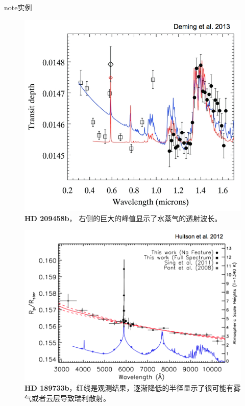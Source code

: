 \documentclass[letterpaper,10pt,english]{sphinxmanual}
\begin{document}
\begin{notice}{note}{实例}
\begin{figure}[htbp]
\centering
\capstart

\includegraphics{transmission1.png}
\caption{\textbf{HD 209458b}， 右侧的巨大的峰值显示了水蒸气的透射波长。}\end{figure}
\begin{figure}[htbp]
\centering
\capstart

\includegraphics{transmission2.png}
\caption{\textbf{HD 189733b}，红线是观测结果，逐渐降低的半径显示了很可能有雾气或者云层导致瑞利散射。}\end{figure}
\begin{figure}[htbp]
\centering
\capstart


\end{figure}
\end{notice}
\end{document}
